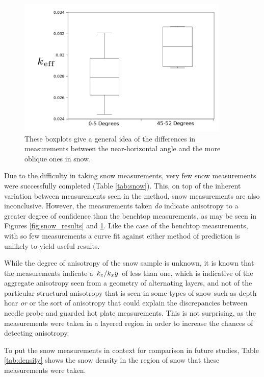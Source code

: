 \begin{figure}[h]
\centering
\includegraphics[width=0.9\textwidth]{fig/snow_meas_boxplot.png}
\caption{These boxplots give a general idea of the differences in measurements
between the near-horizontal angle and the more oblique ones in snow.}
\label{fig:test_boxplot}
\end{figure}


Due to the difficulty in taking snow measurements, very few snow measurements were
successfully completed (Table \ref{tab:snow}). This, on top of the inherent variation between measurements seen in the method, snow measurements are also inconclusive. However, the
measurements taken \emph{do} indicate anisotropy to a greater degree of confidence
than the benchtop measurements, as may be seen in Figures \ref{fig:snow_results}
 and \ref{fig:test_boxplot}. Like the case of the benchtop measurements, with so few
measurements a curve fit against either method of prediction is unlikely to
yield useful results.

While the degree of anisotropy of the snow sample is unknown, it is known that
the measurements indicate a \(\left.{k_z}\middle/{k_xy}\right.\) of less than one, which is
indicative of the aggregate anisotropy seen from a geometry of alternating
layers, and not of the particular structural anisotropy that is seen in some
types of snow such as depth hoar \emph{or} or the sort of anisotropy that could
explain the discrepancies between needle probe and guarded hot plate measurements.
This is not surprising, as the measurements were taken in a layered region in
order to increase the chances of detecting anisotropy.

To put the snow measurements in context for comparison in future studies, Table
\ref{tab:density} shows the snow density in the region of snow
that these measurements were taken.

